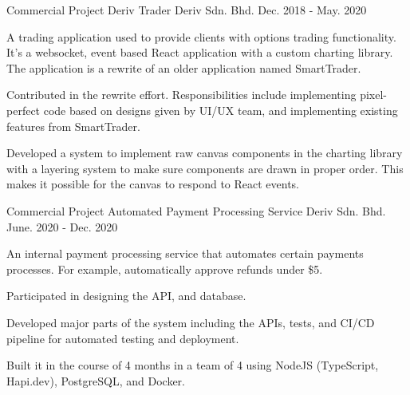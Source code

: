 

\begin{cventries}

  \cventry
    {Commercial Project} %
    {Deriv Trader} %
    {Deriv Sdn. Bhd.} %
    {Dec. 2018 - May. 2020} %
    {
      \begin{cvitems} %
        \item {A trading application used to provide clients with options trading functionality. It's a websocket, event based React application with a custom charting library. The application is a rewrite of an older application named SmartTrader.}
        \item {Contributed in the rewrite effort. Responsibilities include implementing pixel-perfect code based on designs given by UI/UX team, and implementing existing features from SmartTrader.}
        \item {Developed a system to implement raw canvas components in the charting library with a layering system to make sure components are drawn in proper order. This makes it possible for the canvas to respond to React events.}
      \end{cvitems}
    }

  \cventry
    {Commercial Project} %
    {Automated Payment Processing Service} %
    {Deriv Sdn. Bhd.} %
    {June. 2020 - Dec. 2020} %
    {
      \begin{cvitems} %
        \item {An internal payment processing service that automates certain payments processes. For example, automatically approve refunds under \$5.}
        \item {Participated in designing the API, and database.}
        \item {Developed major parts of the system including the APIs, tests, and CI/CD pipeline for automated testing and deployment.}
        \item {Built it in the course of 4 months in a team of 4 using NodeJS (TypeScript, Hapi.dev), PostgreSQL, and Docker.}
      \end{cvitems}
    }


\end{cventries}
